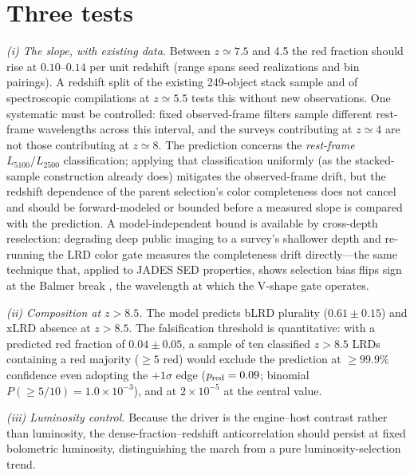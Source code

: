 \documentclass[twocolumn]{aastex631}
\begin{document}
\section{Three tests}\label{sec:tests}

\emph{(i) The slope, with existing data.} Between $z\simeq7.5$ and 4.5
the red fraction should rise at $0.10$--$0.14$ per unit redshift (range
spans seed realizations and bin pairings). A redshift split of the
existing 249-object stack sample \citep{PerezGonzalez2026} and of
spectroscopic compilations at $z\simeq5.5$ tests this without new
observations. One systematic must be controlled: fixed observed-frame
filters sample different rest-frame wavelengths across this interval, and
the surveys contributing at $z\simeq4$ are not those contributing at
$z\simeq8$. The prediction concerns the \emph{rest-frame}
$L_{5100}/L_{2500}$ classification; applying that classification
uniformly (as the stacked-sample construction already does) mitigates the
observed-frame drift, but the redshift dependence of the parent
selection's color completeness does not cancel and should be
forward-modeled or bounded before a measured slope is compared with the
prediction. A model-independent bound is available by cross-depth
reselection: degrading deep public imaging to a survey's shallower depth
and re-running the LRD color gate measures the completeness drift
directly---the same technique that, applied to JADES SED properties,
shows selection bias flips sign at the Balmer break
\citep{PandevXDC}, the wavelength at which the V-shape gate operates.

\emph{(ii) Composition at $z>8.5$.} The model predicts bLRD plurality
($0.61\pm0.15$) and xLRD absence at $z>8.5$. The falsification threshold
is quantitative: with a predicted red fraction of $0.04\pm0.05$, a sample
of ten classified $z>8.5$ LRDs containing a red majority ($\ge5$ red)
would exclude the prediction at $\ge99.9\%$ confidence even adopting the
$+1\sigma$ edge ($p_{\rm red}=0.09$; binomial
$P(\ge5/10)=1.0\times10^{-3}$), and at $2\times10^{-5}$ at the central
value.

\emph{(iii) Luminosity control.} Because the driver is the engine--host
contrast rather than luminosity, the dense-fraction--redshift
anticorrelation should persist at fixed bolometric luminosity,
distinguishing the march from a pure luminosity-selection trend.
\end{document}
